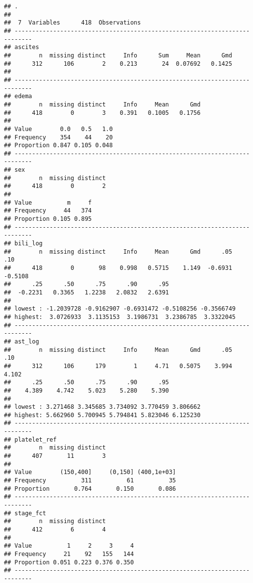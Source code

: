 \documentclass[]{book}
\theoremstyle{definition}
\theoremstyle{definition}
\theoremstyle{definition}
\theoremstyle{remark}
\begin{document}
\begin{verbatim}
## . 
## 
##  7  Variables      418  Observations
## ---------------------------------------------------------------------------
## ascites 
##        n  missing distinct     Info      Sum     Mean      Gmd 
##      312      106        2    0.213       24  0.07692   0.1425 
## 
## ---------------------------------------------------------------------------
## edema 
##        n  missing distinct     Info     Mean      Gmd 
##      418        0        3    0.391   0.1005   0.1756 
##                             
## Value        0.0   0.5   1.0
## Frequency    354    44    20
## Proportion 0.847 0.105 0.048
## ---------------------------------------------------------------------------
## sex 
##        n  missing distinct 
##      418        0        2 
##                       
## Value          m     f
## Frequency     44   374
## Proportion 0.105 0.895
## ---------------------------------------------------------------------------
## bili_log 
##        n  missing distinct     Info     Mean      Gmd      .05      .10 
##      418        0       98    0.998   0.5715    1.149  -0.6931  -0.5108 
##      .25      .50      .75      .90      .95 
##  -0.2231   0.3365   1.2238   2.0832   2.6391 
## 
## lowest : -1.2039728 -0.9162907 -0.6931472 -0.5108256 -0.3566749
## highest:  3.0726933  3.1135153  3.1986731  3.2386785  3.3322045
## ---------------------------------------------------------------------------
## ast_log 
##        n  missing distinct     Info     Mean      Gmd      .05      .10 
##      312      106      179        1     4.71   0.5075    3.994    4.102 
##      .25      .50      .75      .90      .95 
##    4.389    4.742    5.023    5.280    5.390 
## 
## lowest : 3.271468 3.345685 3.734092 3.770459 3.806662
## highest: 5.662960 5.700945 5.794841 5.823046 6.125230
## ---------------------------------------------------------------------------
## platelet_ref 
##        n  missing distinct 
##      407       11        3 
##                                               
## Value        (150,400]     (0,150] (400,1e+03]
## Frequency          311          61          35
## Proportion       0.764       0.150       0.086
## ---------------------------------------------------------------------------
## stage_fct 
##        n  missing distinct 
##      412        6        4 
##                                   
## Value          1     2     3     4
## Frequency     21    92   155   144
## Proportion 0.051 0.223 0.376 0.350
## ---------------------------------------------------------------------------
\end{verbatim}
\end{document}
